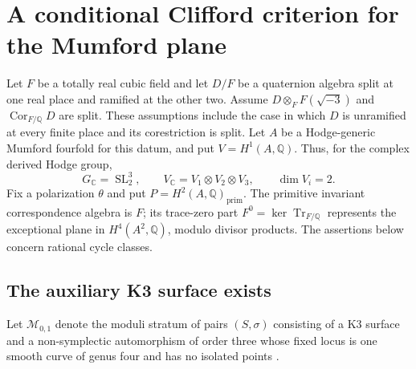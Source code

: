 \documentclass[11pt]{article}
\theoremstyle{definition}
\theoremstyle{remark}
\begin{document}
\section{A conditional Clifford criterion for the Mumford plane}
\label{clifford-sec:criterion}

Let $F$ be a totally real cubic field and let $D/F$ be a quaternion algebra
split at one real place and ramified at the other two.  Assume
$D\otimes_F F(\sqrt{-3})$ and $\operatorname{Cor}_{F/\mathbb Q}D$ are split.
These assumptions include the case in which $D$ is unramified at every finite
place and its corestriction is split.  Let $A$ be a Hodge-generic Mumford
fourfold for this datum, and put $V=H^1(A,\mathbb Q)$.  Thus, for the complex
derived Hodge group,
\[
 G_{\mathbb C}=\operatorname{SL}_2^3,
 \qquad V_{\mathbb C}=V_1\otimes V_2\otimes V_3,
 \qquad \dim V_i=2.
\]
Fix a polarization $\theta$ and put $P=H^2(A,\mathbb Q)_{\mathrm{prim}}$.
The primitive invariant correspondence algebra is $F$; its trace-zero
part $F^0=\ker\operatorname{Tr}_{F/\mathbb Q}$ represents the exceptional
plane in $H^4(A^2,\mathbb Q)$, modulo divisor products.  The assertions below
concern rational cycle classes.

\subsection{The auxiliary K3 surface exists}
Let $\mathcal M_{0,1}$ denote the moduli stratum of pairs $(S,\sigma)$
consisting of a K3 surface and a non-symplectic automorphism of order three
whose fixed locus is one smooth curve of genus four and has no isolated
points \cite[Theorem~2.2, Table~1 and \S5]{clifford-AS}.
\end{document}
